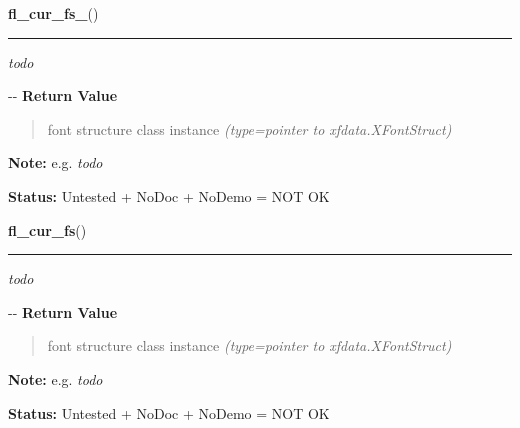     \label{xformslib:flmisc:fl_cur_fs_}

    \vspace{0.5ex}

\hspace{.8\funcindent}\begin{boxedminipage}{\funcwidth}

    \raggedright \textbf{fl\_cur\_fs\_}()

    \vspace{-1.5ex}

    \rule{\textwidth}{0.5\fboxrule}
\setlength{\parskip}{2ex}

\emph{todo}

-{}-
\setlength{\parskip}{1ex}
      \textbf{Return Value}
    \vspace{-1ex}

      \begin{quote}

font structure class instance
      {\it (type=pointer to xfdata.XFontStruct)}

      \end{quote}

\textbf{Note:} 
e.g. \emph{todo}


\textbf{Status:} 
Untested + NoDoc + NoDemo = NOT OK


    \end{boxedminipage}

    \label{xformslib:flmisc:fl_cur_fs_}

    \vspace{0.5ex}

\hspace{.8\funcindent}\begin{boxedminipage}{\funcwidth}

    \raggedright \textbf{fl\_cur\_fs}()

    \vspace{-1.5ex}

    \rule{\textwidth}{0.5\fboxrule}
\setlength{\parskip}{2ex}

\emph{todo}

-{}-
\setlength{\parskip}{1ex}
      \textbf{Return Value}
    \vspace{-1ex}

      \begin{quote}

font structure class instance
      {\it (type=pointer to xfdata.XFontStruct)}

      \end{quote}

\textbf{Note:} 
e.g. \emph{todo}


\textbf{Status:} 
Untested + NoDoc + NoDemo = NOT OK


    \end{boxedminipage}

